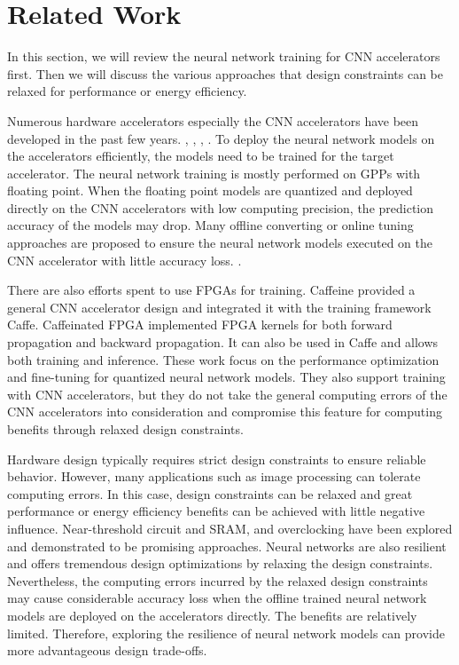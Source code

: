 \section{Related Work} \label{sec:relatedwork}
In this section, we will review the neural network training for CNN accelerators first.
Then we will discuss the various approaches that design constraints can be relaxed for
performance or energy efficiency. 

Numerous hardware accelerators especially the CNN accelerators have
been developed in the past few years. \cite{Cnvlutin_25} 
\cite{deepburing_12}, \cite{Aydonat_27}, 
\cite{Caffeine_6}, \cite{Wei_29}. To 
deploy the neural network models on the accelerators efficiently, 
the models need to be trained for the target accelerator. 
The neural network training is mostly performed on GPPs with floating point.
When the floating point models are quantized and deployed directly 
on the CNN accelerators with low computing precision, the prediction 
accuracy of the models may drop. Many offline converting or online 
tuning approaches are proposed to ensure the neural network models 
executed on the CNN accelerator with little accuracy loss.
\cite{Matthieu2014_8, Hwang2014_17}. 

There are also efforts spent to use FPGAs for training. 
Caffeine\cite{Caffeine_6} provided a general CNN accelerator design and integrated it with 
the training framework Caffe. Caffeinated FPGA\cite{DiCecco_4} implemented FPGA kernels 
for both forward propagation and backward propagation. It can also be used in Caffe 
and allows both training and inference. These work focus on the performance optimization 
and fine-tuning for quantized neural network models. 
They also support training with CNN accelerators, but they do not take the general 
computing errors of the CNN accelerators into consideration and compromise this 
feature for computing benefits through relaxed design constraints.

Hardware design typically requires strict design constraints to ensure 
reliable behavior. However, many applications such as image processing 
can tolerate computing errors. In this case, design constraints can be 
relaxed and great performance or energy efficiency benefits can be achieved 
with little negative influence. Near-threshold circuit and SRAM, 
and overclocking \cite{overclock_3} have been explored and demonstrated 
to be promising approaches. Neural networks are also resilient and 
offers tremendous design optimizations by relaxing the design constraints. 
Nevertheless, the computing errors incurred by the relaxed design constraints 
may cause considerable accuracy loss when the offline 
trained neural network models are deployed on the accelerators directly. 
The benefits are relatively limited. Therefore, exploring the resilience 
of neural network models can provide more advantageous design trade-offs. 

